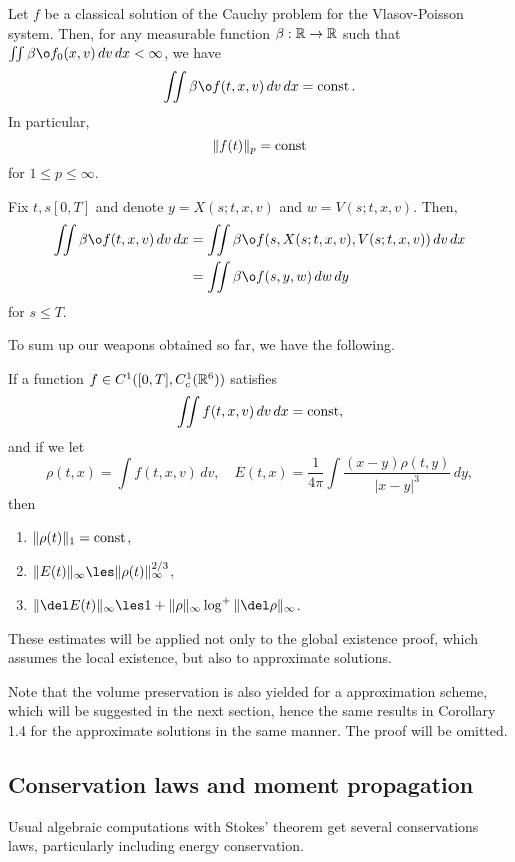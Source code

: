 \documentclass[11pt]{amsart}
\begin{document}
\begin{cor}
Let $f$ be a classical solution of the Cauchy problem for the Vlasov-Poisson system.
Then, for any measurable function $\beta:\mathbb{R}\to\mathbb{R}$ such that $\iint\beta\o f_0(x,v)\,dv\,dx<\infty$, we have
\[\iint\beta\o f(t,x,v)\,dv\,dx=\const.\]
In particular,
\[\|f(t)\|_p=\operatorname{const}\]
for $1\le p\le\infty$.
\end{cor}
\begin{pf}
Fix $t,s[0,T]$ and denote $y=X(s;t,x,v)$ and $w=V(s;t,x,v)$.
Then,
\begin{align*}
\iint\beta\o f(t,x,v)\,dv\,dx
&=\iint\beta\o f(s,X(s;t,x,v),V(s;t,x,v))\,dv\,dx\\
&=\iint\beta\o f(s,y,w)\,dw\,dy
\end{align*}
for $s\le T$.
\end{pf}

To sum up our weapons obtained so far, we have the following.
\begin{cor}
If a function $f\in C^1([0,T],C_c^1(\mathbb{R}^6))$ satisfies
\[\iint f(t,x,v)\,dv\,dx=\operatorname{const},\]
and if we let
\[\rho(t,x)=\int f(t,x,v)\,dv,\quad E(t,x)=\frac1{4\pi}\int\frac{(x-y)\rho(t,y)}{|x-y|^3}\,dy,\]
then
\begin{enumerate}
\item $\|\rho(t)\|_1=\operatorname{const}$,
\item $\|E(t)\|_\infty\les\|\rho(t)\|_\infty^{2/3}$,
\item $\|\del E(t)\|_\infty\les1+\|\rho\|_\infty\log^+\|\del\rho\|_\infty$.
\end{enumerate}
\end{cor}
These estimates will be applied not only to the global existence proof, which assumes the local existence, but also to approximate solutions.

\begin{rmk}
Note that the volume preservation is also yielded for a approximation scheme, which will be suggested in the next section, hence the same results in Corollary 1.4 for the approximate solutions in the same manner.
The proof will be omitted.
\end{rmk}


\subsection{Conservation laws and moment propagation}
Usual algebraic computations with Stokes' theorem get several conservations laws, particularly including energy conservation.
\end{document}

